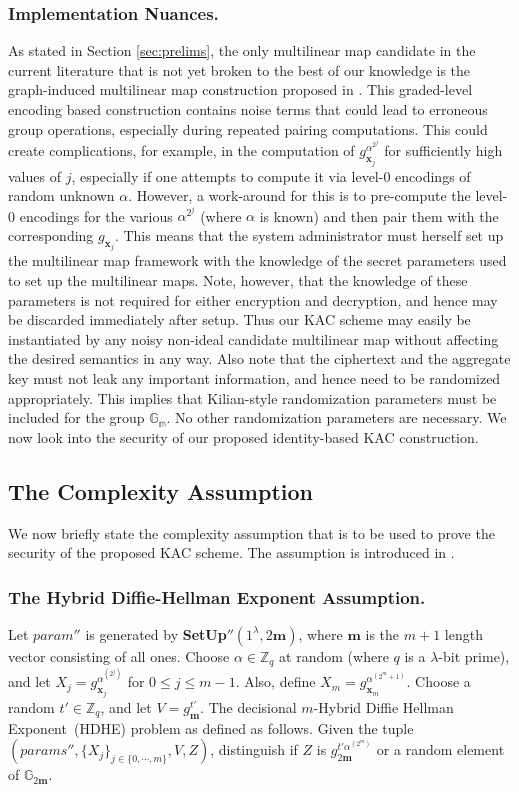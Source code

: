\subsubsection{Implementation Nuances.}  As stated in Section \ref{sec:prelims}, the only multilinear map candidate in the current literature that is not yet broken to the best of our knowledge is the graph-induced multilinear map construction proposed in \cite{gentry2015graph}. This graded-level encoding based construction contains noise terms that could lead to erroneous group operations, especially during repeated pairing computations. This could create complications, for example, in the computation of $g^{\alpha^{2^j}}_{\mathbf{x}_j}$ for sufficiently high values of $j$, especially if one attempts to compute it via level-0 encodings of random unknown $\alpha$. However, a work-around for this is to pre-compute the level-0 encodings for the various $\alpha^{2^j}$ (where $\alpha$ is known) and then pair them with the corresponding $g_{\mathbf{x}_j}$. This means that the system administrator must herself set up the multilinear map framework with the knowledge of the secret parameters used to set up the multilinear maps. Note, however, that the knowledge of these parameters is not required for either encryption and decryption, and hence may be discarded immediately after setup. Thus our KAC scheme may easily be instantiated by any noisy non-ideal candidate multilinear map without affecting the desired semantics in any way. Also note that the ciphertext and the aggregate key must not leak any important information, and hence need to be randomized appropriately. This implies that Kilian-style randomization parameters must be included for the group $\mathbb{G}_{\mathbb{m}}$. No other randomization parameters are necessary. We now look into the security of our proposed identity-based KAC construction.


\subsection{The Complexity Assumption}
\label{subsec:complexity}

We now briefly state the complexity assumption that is to be used to prove the security of the proposed KAC scheme. The assumption is introduced in \cite{boneh2014low}.

\subsubsection{The Hybrid Diffie-Hellman Exponent Assumption.} Let $param''$ is generated by \textbf{SetUp}$''(1^{\lambda},2\mathbf{m})$, where $\mathbf{m}$ is the $m+1$ length vector consisting of all ones. Choose $\alpha \in \mathbb{Z}_q$ at random (where $q$ is a $\lambda$-bit prime), and let $X_j=g^{\alpha^{(2^j)}}_{\mathbf{x}_j}$ for $0\leq j \leq m-1$. Also, define $X_m=g^{\alpha^{(2^m+1)}}_{\mathbf{x}_m}$. Choose a random $t'\in\mathbb{Z}_q$, and let $V=g^{t'}_{\mathbf{m}}$. The decisional $m$-Hybrid Diffie Hellman Exponent~(HDHE) problem as defined as follows. Given the tuple $(params'',\{X_j\}_{j\in\{0,\cdots,m\}},V,Z)$, distinguish if $Z$ is $g^{t'\alpha^{(2^m)}}_{2\mathbf{m}}$ or a random element of $\mathbb{G}_{2\mathbf{m}}$.


